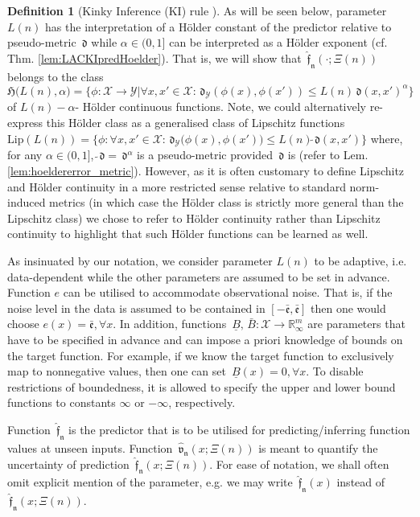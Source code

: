 \documentclass{article} %
\theoremstyle{definition}
\newtheorem{defn}[thm]{Definition}
\theoremstyle{remark}
\newcommand{\Real}{\mathbb R}
\newcommand{\param}{\ensuremath{\Xi}}%
\newcommand{\inspace}{\ensuremath{ \mathcal X}}
\newcommand{\outspace}{\ensuremath{ \mathcal Y}}
\newcommand{\metric}{\, \mathfrak{d}} %
\newcommand{\Metrico}[2]{\metric_\outspace\bigl(#1,#2\bigr) }
\newcommand{\predf}{\, \mathfrak{  \hat f}} %
\newcommand{\predfn}{\, \mathfrak{  \hat f_n}} %
\newcommand{\prederrn}{\, \mathfrak{\hat v_n}} %
\newcommand{\hexp}{{ \alpha }}%
\newcommand{\ubf}{\, {\bar B}} %
\newcommand{\lbf}{\, {\underline{B}}} %
\newcommand{\Hoelset}{\mathfrak{H}}
\newcommand{\obserrpar}{e} %
\newcommand{\obserrbnd}{\bar{\mathfrak e}}
\begin{document}
\begin{defn}[Kinky Inference (KI) rule ]
  As will be seen below,  parameter $L(n)$ has the interpretation of a H\"older constant of the predictor relative to pseudo-metric $\metric$ while $\hexp \in (0,1]$ can be interpreted as a H\"older exponent (cf. Thm. \ref{lem:LACKIpredHoelder}). That is, we will show that $\predfn(\cdot;\param(n))$ belongs to the class $$\Hoelset \bigl(L(n),\hexp\bigr) = \{ \phi: \inspace \to \outspace | \forall x,x' \in \inspace : \metric_\outspace(\phi(x),\phi(x') ) \leq L(n) \metric(x,x')^\hexp\}$$ of $L(n)-\hexp$- H\"older continuous functions. Note, we could alternatively re-express this H\"older class as a generalised class of Lipschitz functions $\text{Lip}(L(n))= \{ \phi: \forall x,x' \in \inspace: \Metrico{\phi(x)}{\phi(x')} \leq L(n) \tilde \metric (x,x')\} $ where, for any $\hexp \in (0,1]$, $\tilde \metric = \metric^\alpha$ is a pseudo-metric provided  $\metric$ is (refer to Lem. \ref{lem:hoeldererror_metric}). However, as it is often customary to define Lipschitz and H\"older continuity in a more restricted sense relative to standard norm-induced metrics (in which case the H\"older class is strictly more general than the Lipschitz class) we chose to refer to H\"older continuity rather than Lipschitz continuity to highlight that such H\"older functions can be learned as well.
  
  As insinuated by our notation, we consider parameter $L(n)$ to be adaptive, i.e.  data-dependent while the other parameters are assumed to be set in advance.
 Function $\obserrpar$ can be utilised to accommodate observational noise. 
That is, if the noise level in the data is assumed to be contained in $[-\obserrbnd, \obserrbnd]$ then one would choose $\obserrpar(x) = \obserrbnd,\forall x$.
In addition,  functions $\lbf,\ubf:  \inspace \to \Real_\infty^m$ are parameters that have to be specified in advance and can impose a priori knowledge of bounds on the target function. For example, if we know the target function to exclusively map to nonnegative values, then one can set $\lbf(x) = 0,\forall x$.
To disable restrictions of boundedness, it is allowed to specify the upper and lower bound functions to constants $\infty$ or $-\infty$, respectively.	

  
Function $\predfn$ is the predictor that is to be utilised for predicting/inferring function values at unseen inputs. Function $\prederrn(x;\param(n))$ is meant to quantify the uncertainty of prediction $\predfn(x;\param(n))$. 
For ease of notation, we shall often omit explicit mention of the parameter, e.g. we may write $\predfn(x)$ instead of $\predfn(x;\param(n))$.
\end{defn}
\end{document}
